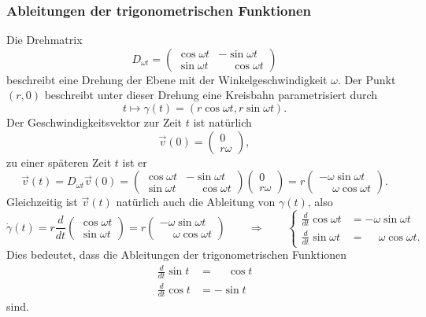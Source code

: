 \subsubsection{Ableitungen der trigonometrischen Funktionen}
%
Die Drehmatrix 
\[
D_{\omega t}
=
\begin{pmatrix}
\cos\omega t&         - \sin\omega t\\
\sin\omega t&\phantom{-}\cos\omega t
\end{pmatrix}
\]
beschreibt eine Drehung der Ebene mit der Winkelgeschwindigkeit 
$\omega$.
Der Punkt $(r,0)$ beschreibt unter dieser Drehung eine Kreisbahn
%
parametrisiert durch 
\[
t \mapsto \gamma(t)=(r\cos\omega t,r\sin\omega t).
\]
Der Geschwindigkeitsvektor zur Zeit $t$ ist natürlich
\[
\vec{v}(0)
=
\begin{pmatrix}
0\\
r\omega
\end{pmatrix},
\]
zu einer späteren Zeit $t$  ist er
\[
\vec{v}(t)
=
D_{\omega t} \vec{v}(0)
=
\begin{pmatrix}
\cos\omega t&         - \sin\omega t\\
\sin\omega t&\phantom{-}\cos\omega t
\end{pmatrix}
\begin{pmatrix}
0\\r\omega
\end{pmatrix}
=
r
\begin{pmatrix}
         - \omega\sin\omega t\\
\phantom{-}\omega\cos\omega t
\end{pmatrix}.
\]
Gleichzeitig ist $\vec{v}(t)$ natürlich auch die Ableitung  von $\gamma(t)$,
also
\[
\dot{\gamma}(t)
=
r
\frac{d}{dt}
\begin{pmatrix}
\cos\omega t\\
\sin\omega t
\end{pmatrix}
=
r
\begin{pmatrix}
         - \omega\sin\omega t\\
\phantom{-}\omega\cos\omega t
\end{pmatrix}
\qquad\Rightarrow\qquad
\left\{
\begin{aligned}
\frac{d}{dt} \cos\omega t &= -\omega \sin\omega t\\
\frac{d}{dt} \sin\omega t &= \phantom{-} \omega \cos\omega t.
\end{aligned}
\right.
\]
Dies bedeutet, dass die Ableitungen der trigonometrischen Funktionen
\begin{equation}
\begin{aligned}
\frac{d}{dt} \sin t&=\phantom{-}\cos t\\
\frac{d}{dt} \cos t&=-\sin t
\end{aligned}
\label{buch:differentialgleichungen:trigo:ableitungen}
\end{equation}
sind.

